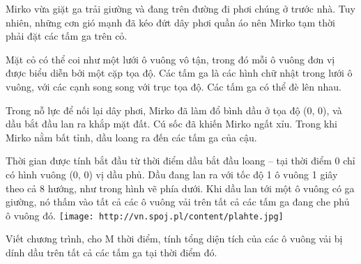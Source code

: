 Mirko vừa giặt ga trải giường và đang trên đường đi phơi chúng ở trước nhà. Tuy nhiên, những cơn gió mạnh đã kéo đứt dây phơi quần áo nên Mirko tạm thời phải đặt các tấm ga trên cỏ.  

   Mặt cỏ có thể coi như một lưới ô vuông vô tận, trong đó mỗi ô vuông đơn vị được biểu diễn bởi một cặp tọa độ. Các tấm ga là các hình chữ nhật trong lưới ô vuông, với các cạnh song song với trục tọa độ. Các tấm ga có thể đè lên nhau.  

   Trong nỗ lực để nối lại dây phơi, Mirko đã làm đổ bình dầu ở tọa độ (0, 0), và dầu bắt đầu lan ra khắp mặt đất. Cú sốc đã khiến Mirko ngất xỉu. Trong khi Mirko nằm bất tỉnh, dầu loang ra đến các tấm ga của cậu.  

   Thời gian được tính bắt đầu từ thời điểm dầu bắt đầu loang – tại thời điểm 0 chỉ có hình vuông (0, 0) vị dầu phủ. Dầu đang lan ra với tốc độ 1 ô vuông 1 giây theo cả 8 hướng, như trong hình vẽ phía dưới. Khi dầu lan tới một ô vuông có ga giường, nó thấm vào tất cả các ô vuông vải trên tất cả các tấm ga đang che phủ ô vuông đó.  
\texttt{[image: http://vn.spoj.pl/content/plahte.jpg]}

   Viết chương trình, cho M thời điểm, tính tổng diện tích của các ô vuông vải bị dính dầu trên tất cả các tấm ga tại thời điểm đó.